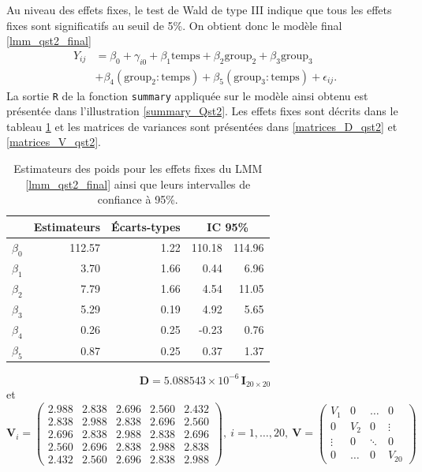 \documentclass{article}
\begin{document}
	Au niveau des effets fixes, le test de Wald de type III indique que tous les effets fixes sont significatifs au seuil de 5\%. On obtient donc le modèle final \eqref{lmm_qst2_final}
	\begin{align}\label{lmm_qst2_final}
		Y_{ij} &= \beta_0 + \gamma_{i0} + \beta_1 \mathrm{temps} + \beta_2 \mathrm{group_2} + \beta_3 \mathrm{group_3}\\
		&+ \beta_4 (\mathrm{group_2:temps}) + \beta_5 (\mathrm{group_3:temps}) + \epsilon_{ij}. \nonumber
	\end{align}
	La sortie \texttt{R} de la fonction \texttt{summary} appliquée sur le modèle ainsi obtenu est présentée dans l'illustration \ref{summary_Qst2}. Les effets fixes sont décrits dans le tableau \ref{tbl_effets_fixes_qst2} et les matrices de variances sont présentées dans \eqref{matrices_D_qst2} et \eqref{matrices_V_qst2}.
	\begin{table}[ht]
		\centering
		\begin{tabular}{lrrrr}
			\hline
			& Estimateurs & Écarts-types &  \multicolumn{2}{c}{IC 95\%} \\ 
			\hline
			$\beta_0$ & 112.57 & 1.22 & 110.18 & 114.96 \\ 
			$\beta_1$ & 3.70 & 1.66 & 0.44 & 6.96 \\ 
			$\beta_2$ & 7.79 & 1.66 & 4.54 & 11.05 \\ 
			$\beta_3$ & 5.29 & 0.19 & 4.92 & 5.65 \\ 
			$\beta_4$ & 0.26 & 0.25 & -0.23 & 0.76 \\ 
			$\beta_5$ & 0.87 & 0.25 & 0.37 & 1.37 \\ 
			\hline
		\end{tabular}
		\caption{Estimateurs des poids pour les effets fixes du LMM \eqref{lmm_qst2_final} ainsi que leurs intervalles de confiance à 95\%.}
		\label{tbl_effets_fixes_qst2}
	\end{table}
	\begin{equation}\label{matrices_D_qst2}
		\boldsymbol{D} = 5.088543\times10^{-6}\, \boldsymbol{I}_{20\times 20}
	\end{equation}
	et
	\begin{equation}\label{matrices_V_qst2}
		\boldsymbol{V}_i = 
		\begin{pmatrix}
			2.988 & 2.838 & 2.696 & 2.560 & 2.432 \\
			2.838 & 2.988 & 2.838 & 2.696 & 2.560 \\
			2.696 & 2.838 & 2.988 & 2.838 & 2.696 \\
			2.560 & 2.696 & 2.838 & 2.988 & 2.838 \\
			2.432 & 2.560 & 2.696 & 2.838 & 2.988
		\end{pmatrix}, \ i=1,\dots,20,\ 
	\boldsymbol{V} = \begin{pmatrix}
		V_1 & 0 & \dots & 0 \\
		0 & V_2 & 0 & \vdots \\
		\vdots & 0 & \ddots & 0 \\
		0 & \dots & 0 & V_{20}
	\end{pmatrix}
	\end{equation}
			
\end{document}

